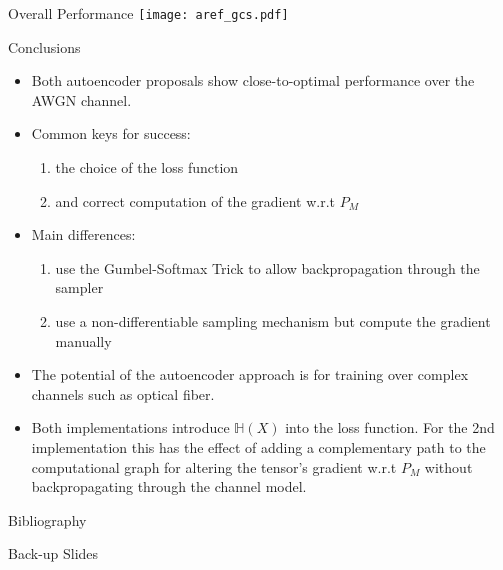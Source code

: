 \documentclass[english,aspectratio=1610,9pt,helvet,nicetitles]{ICEbeamerTUMCD}
\begin{document}
\begin{frame}{Overall Performance}
	\centering
	\texttt{[image: aref\_gcs.pdf]}
	\label{fig:arefPerf}

\end{frame}

\begin{frame}{Conclusions}
\begin{itemize}
\item Both autoencoder proposals show close-to-optimal performance over the AWGN channel. \pause
\item Common keys for success:
	\begin{enumerate}
	\item the choice of the loss function
	\item and correct computation of the gradient w.r.t $P_M$
\end{enumerate}	\pause
\item Main differences:
	\begin{enumerate}
	\item \citeauthor{Stark} use the Gumbel-Softmax Trick to allow backpropagation through the sampler
	\item \citeauthor{Aref} use a non-differentiable sampling mechanism but compute the gradient manually
\end{enumerate}	 \pause
\item The potential of the autoencoder approach is for training over complex channels such as optical fiber.\pause
\item Both implementations introduce $\mathbb{H}(X)$ into the loss function. For the 2nd implementation this has the effect of adding a complementary path to the computational graph for altering the tensor's gradient w.r.t $P_M$ without backpropagating through the channel model.
\end{itemize}
\end{frame}

\begin{frame}{Bibliography}
\printbibliography[heading=none]
\end{frame}

\begin{frame}
\begin{Huge}
Back-up Slides
\end{Huge}
\end{frame}
\end{document}
